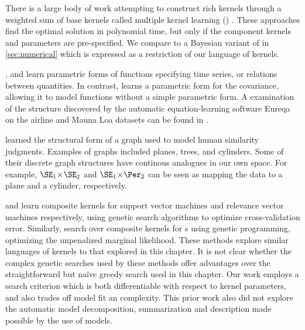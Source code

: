 There is a large body of work attempting to construct rich kernels through a weighted sum of base kernels called multiple kernel learning (\MKL{}) \citep[e.g.][]{bach2004multiple}.
These approaches find the optimal solution in polynomial time, but only if the component kernels and parameters are pre-specified.
We compare to a Bayesian variant of \MKL{} in \cref{sec:numerical} which is expressed as a restriction of our language of kernels.


\cite{todorovski1997declarative}, \cite{washio1999discovering} and \cite{Schmidt2009b} learn parametric forms of functions specifying time series, or relations between quantities.
In contrast, \procedurename{} learns a parametric form for the covariance, allowing it to model functions without a simple parametric form.
A examination of the structure discovered by the automatic equation-learning software Eureqa \citep{Eureqa} on the airline and Mauna Loa datasets can be found in .





\citet{kemp2008discovery} learned the structural form of a graph used to model human similarity judgments.
Examples of graphs included planes, trees, and cylinders.
Some of their discrete graph structures have continous analogues in our own space.
For example, $\SE_1 \kerntimes \SE_2$ and $\SE_1 \kerntimes \Per_2$ can be seen as mapping the data to a plane and a cylinder, respectively.

\citet{diosan2007evolving} and \citet{bing2010gp} learn composite kernels for support vector machines and relevance vector machines respectively, using genetic search algorithms to optimize cross-validation error.
Similarly, \citet{kronberger2013evolution} search over composite kernels for \gp{}s using genetic programming, optimizing the unpenalized marginal likelihood.
These methods explore similar languages of kernels to that explored in this chapter.
It is not clear whether the complex genetic searches used by these methods offer advantages over the straightforward but na\"{i}ve greedy search used in this chapter.
Our work employs a search criterion which is both differentiable with respect to kernel parameters, and also trades off model fit an complexity.
This prior work also did not explore the automatic model decomposition, summarization and description made possible by the use of \gp{} models.



